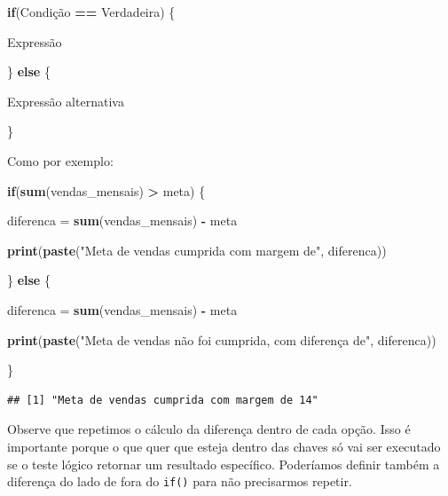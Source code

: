 \documentclass[
]{article}
\newenvironment{Shaded}{\begin{snugshade}}{\end{snugshade}}
\newcommand{\ControlFlowTok}[1]{\textcolor[rgb]{0.13,0.29,0.53}{\textbf{#1}}}
\newcommand{\KeywordTok}[1]{\textcolor[rgb]{0.13,0.29,0.53}{\textbf{#1}}}
\newcommand{\NormalTok}[1]{#1}
\newcommand{\OperatorTok}[1]{\textcolor[rgb]{0.81,0.36,0.00}{\textbf{#1}}}
\newcommand{\StringTok}[1]{\textcolor[rgb]{0.31,0.60,0.02}{#1}}
\begin{document}
\begin{Shaded}
\begin{Highlighting}[]
\ControlFlowTok{if}\NormalTok{(Condição }\OperatorTok{==}\StringTok{ }\NormalTok{Verdadeira) \{}
  
\NormalTok{  Expressão}
  
\NormalTok{\} }\ControlFlowTok{else}\NormalTok{ \{}
    
\NormalTok{  Expressão alternativa}
  
\NormalTok{  \}}
\end{Highlighting}
\end{Shaded}

Como por exemplo:

\begin{Shaded}
\begin{Highlighting}[]
\ControlFlowTok{if}\NormalTok{(}\KeywordTok{sum}\NormalTok{(vendas_mensais) }\OperatorTok{>}\StringTok{ }\NormalTok{meta) \{}
  
\NormalTok{  diferenca =}\StringTok{ }\KeywordTok{sum}\NormalTok{(vendas_mensais) }\OperatorTok{-}\StringTok{ }\NormalTok{meta}
  
  \KeywordTok{print}\NormalTok{(}\KeywordTok{paste}\NormalTok{(}\StringTok{"Meta de vendas cumprida com margem de"}\NormalTok{, diferenca))}

\NormalTok{\} }\ControlFlowTok{else}\NormalTok{ \{}
  
\NormalTok{  diferenca =}\StringTok{ }\KeywordTok{sum}\NormalTok{(vendas_mensais) }\OperatorTok{-}\StringTok{ }\NormalTok{meta}
  
  \KeywordTok{print}\NormalTok{(}\KeywordTok{paste}\NormalTok{(}\StringTok{"Meta de vendas não foi cumprida, com diferença de"}\NormalTok{, diferenca))  }
  
\NormalTok{  \}}
\end{Highlighting}
\end{Shaded}

\begin{verbatim}
## [1] "Meta de vendas cumprida com margem de 14"
\end{verbatim}

Observe que repetimos o cálculo da diferença dentro de cada opção. Isso
é importante porque o que quer que esteja dentro das chaves só vai ser
executado se o teste lógico retornar um resultado específico. Poderíamos
definir também a diferença do lado de fora do \texttt{if()} para não
precisarmos repetir.
\end{document}

